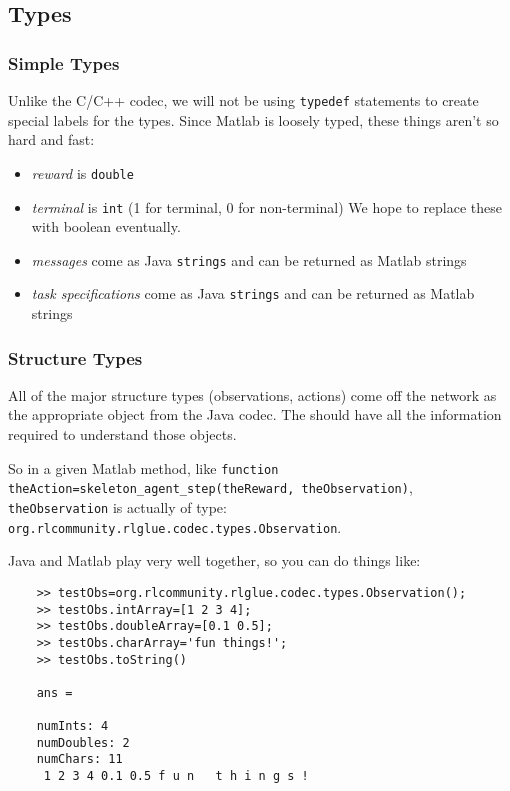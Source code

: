 \documentclass[11pt]{article}
\begin{document}
\subsection{Types}


\subsubsection{Simple Types}
Unlike the C/C++ codec, we will not be using \texttt{typedef} statements to create special labels for the types. Since Matlab is loosely typed, these things aren't so hard and 
fast:
\begin{itemize}
	\item \textit{reward} is \texttt{double}
	\item \textit{terminal} is \texttt{int} (1 for terminal, 0 for non-terminal) We hope to replace these with boolean eventually.
	\item \textit{messages} come as Java \texttt{strings} and can be returned as Matlab strings
	\item \textit{task specifications} come as Java \texttt{strings} and can be returned as Matlab strings
\end{itemize}

\def\rat{RL\_Abstract\_Type}

\subsubsection{Structure Types}
\label{sec:structure-types}
All of the major structure types (observations, actions) come off the network as the appropriate object from the Java codec.
The  should have all the information required to understand those objects.

So in a given Matlab method, like \newline
\texttt{function theAction=skeleton\_agent\_step(theReward, theObservation)}, 
\texttt{theObservation} is actually of type: \texttt{org.rlcommunity.rlglue.codec.types.Observation}.

Java and Matlab play very well together, so you can do things like:
\begin{verbatim}
	>> testObs=org.rlcommunity.rlglue.codec.types.Observation();
	>> testObs.intArray=[1 2 3 4];
	>> testObs.doubleArray=[0.1 0.5];
	>> testObs.charArray='fun things!';
	>> testObs.toString()

	ans =

	numInts: 4
	numDoubles: 2
	numChars: 11
	 1 2 3 4 0.1 0.5 f u n   t h i n g s !
\end{verbatim}
\end{document}
